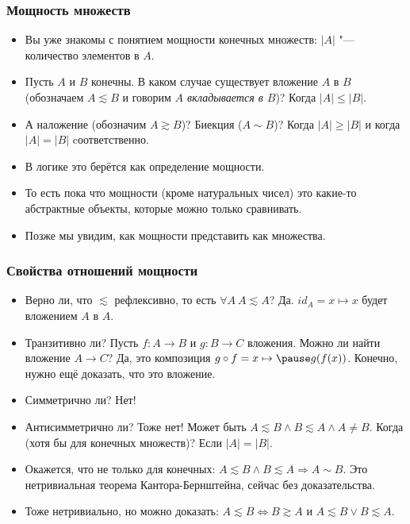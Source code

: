 \documentclass[10pt]{beamer}
\begin{document}
\begin{frame}
    \frametitle{Мощность множеств}
    \begin{itemize}
        \item Вы уже знакомы с понятием мощности конечных множеств: $|A|$ "--- количество элементов в $A$.
        \item Пусть $A$ и $B$ конечны. В каком случае существует вложение $A$ в $B$ (обозначаем $A \lesssim B$ и говорим \emph{$A$ вкладывается в $B$})? \pause Когда $|A| \leq |B|$.
        \pause
        \item А наложение (обозначим $A \gtrsim B$)? Биекция ($A \sim B$)? \pause Когда $|A| \geq |B|$ и \pause когда $|A| = |B|$ cоответственно.
        \pause
        \item В логике это берётся как определение мощности.
        \item То есть пока что мощности (кроме натуральных чисел) это какие-то абстрактные объекты, которые можно только сравнивать.
        \item Позже мы увидим, как мощности представить как множества.
    \end{itemize}
\end{frame}

\begin{frame}
    \frametitle{Свойства отношений мощности}
    \begin{itemize}
        \item Верно ли, что $\lesssim$ рефлексивно, то есть \pause $\forall A~A \lesssim A$? \pause Да. $id_A = x \mapsto x$ будет вложением $A$ в $A$.
        \item Транзитивно ли? Пусть $f: A \to B$ и $g: B \to C$ вложения. Можно ли найти вложение $A \to C$? \pause Да, это композиция $g \circ f = x \mapsto \pause g(f(x))$. Конечно, нужно ещё доказать, что это вложение.
        \item Симметрично ли? \pause Нет!
        \item Антисимметрично ли? \pause Тоже нет! Может быть $A \lesssim B \land B \lesssim A \land A \neq B$. Когда (хотя бы для конечных множеств)? \pause Если $|A| = |B|$.
        \item Окажется, что не только для конечных: $A \lesssim B \land B \lesssim A \Rightarrow A \sim B$. Это нетривиальная теорема Кантора-Бернштейна, сейчас без доказательства.
        \item Тоже нетривиально, но можно доказать: $A \lesssim B \Leftrightarrow B \gtrsim A$ и $A \lesssim B \lor B \lesssim A$.
    \end{itemize}
\end{frame}
\end{document}
